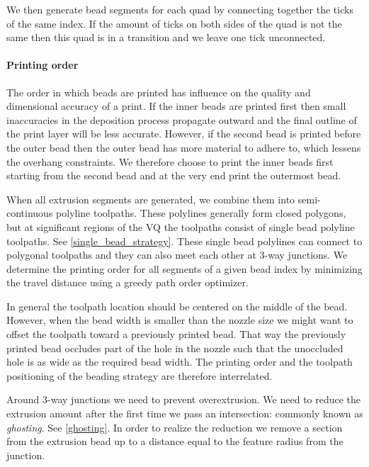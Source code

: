 We then generate bead segments for each quad by connecting together the ticks of the same index.
If the amount of ticks on both sides of the quad is not the same then this quad is in a transition and we leave one tick unconnected.


\paragraph{Printing order}
The order in which beads are printed has influence on the quality and dimensional accuracy of a print.
If the inner beads are printed first then small inaccuracies in the deposition process propagate outward and the final outline of the print layer will be less accurate.
However, if the second bead is printed before the outer bead then the outer bead has more material to adhere to, which lessens the overhang constraints.
We therefore choose to print the inner beads first starting from the second bead and at the very end print the outermost bead.


When all extrusion segments are generated, we combine them into semi-continuous polyline toolpaths.
These polylines generally form closed polygons, but at significant regions of the VQ the toolpaths consist of single bead polyline toolpaths.
See \cref{single_bead_strategy}.
These single bead polylines can connect to polygonal toolpaths and they can also meet each other at 3-way junctions.
We determine the printing order for all segments of a given bead index by minimizing the travel distance using a greedy path order optimizer.


In general the toolpath location should be centered on the middle of the bead.
However, when the bead width is smaller than the nozzle size we might want to offset the toolpath toward a previously printed bead.
That way the previously printed bead occludes part of the hole in the nozzle such that the unoccluded hole is as wide as the required bead width.
The printing order and the toolpath positioning of the beading strategy are therefore interrelated.

Around 3-way junctions we need to prevent overextrusion.
We need to reduce the extrusion amount after the first time we pass an intersection: commonly known as \emph{ghosting}.
See \cref{ghosting}.
In order to realize the reduction we remove a section from the extrusion bead up to a distance equal to the feature radius from the junction.


